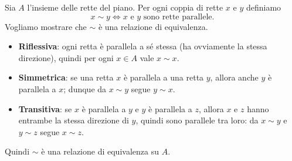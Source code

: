 \begin{esempio}
Sia $A$ l'insieme delle rette del piano. Per ogni coppia di rette $x$ e $y$ definiamo
\[
x \sim y \iff x \text{ e } y \text{ sono rette parallele}.
\]
Vogliamo mostrare che $\sim$ è una relazione di equivalenza.

\begin{itemize}
    \item \textbf{Riflessiva}: ogni retta è parallela a sé stessa (ha ovviamente la stessa direzione),
          quindi per ogni $x\in A$ vale $x \sim x$.
    \item \textbf{Simmetrica}: se una retta $x$ è parallela a una retta $y$, allora anche $y$ è parallela
          a $x$; dunque da $x \sim y$ segue $y \sim x$.
    \item \textbf{Transitiva}: se $x$ è parallela a $y$ e $y$ è parallela a $z$, allora $x$ e $z$
          hanno entrambe la stessa direzione di $y$, quindi sono parallele tra loro: da
          $x \sim y$ e $y \sim z$ segue $x \sim z$.
\end{itemize}
Quindi $\sim$ è una relazione di equivalenza su $A$.
\end{esempio}

















